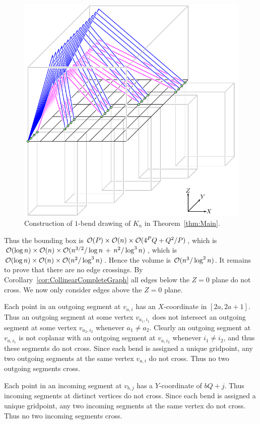 \documentclass[a4paper]{article}
\newcommand{\Oh}[1]{\ensuremath{\protect\mathcal{O}(#1)}}
\newcommand{\Figure}[4][htb]{
\begin{figure}[#1]
	\begin{center}#3\end{center}
	\vspace*{-2ex}
	\caption{\figlabel{#2}#4}
\end{figure}
}
\newcommand{\figlabel}[1]{\label{fig:#1}}
\newcommand{\thmref}[1]{Theorem~\ref{thm:#1}}
\newcommand{\corref}[1]{Corollary~\ref{cor:#1}}
\theoremstyle{plain}
\begin{document}
\Figure{VertexLayout}{\includegraphics{VertexLayout}}{Construction of $1$-bend
drawing of $K_n$ in \thmref{Main}.}

Thus the bounding box is $\Oh{P}\times\Oh{n}\times\Oh{4^PQ+Q^2/P}$, which is 
$\Oh{\log n}\times\Oh{n}\times\Oh{n^{3/2}/\log n\,+\,n^2/\log^3n}$, which is
$\Oh{\log n}\times\Oh{n}\times\Oh{n^2/\log^3n}$. Hence the volume is
\Oh{n^3/\log^2n}. It remains to prove that there are no edge crossings. By 
\corref{CollinearCompleteGraph} all edges below the $Z=0$ plane do not cross.
We now only consider edges above the $Z=0$ plane. 

Each point in an outgoing segment at $v_{a,i}$ has an $X$-coordinate in
$[2a,2a+1]$. Thus an outgoing segment at some vertex $v_{a_1,i_1}$ does not
intersect an outgoing segment at some vertex $v_{a_2,i_2}$ whenever $a_1\ne
a_2$. Clearly an outgoing segment at $v_{a,i_1}$ is not coplanar with an
outgoing segment at $v_{a,i_2}$ whenever $i_1\ne i_2$, and thus these segments
do not cross. Since each bend is assigned a unique gridpoint, any two outgoing
segments at the same vertex $v_{a,i}$ do not cross. Thus no two outgoing
segments cross.

Each point in an incoming segment at $v_{b,j}$ has a $Y$-coordinate of $bQ+j$.
Thus incoming segments at distinct vertices do not cross.  Since each bend is
assigned a unique gridpoint, any two incoming segments at the same vertex do not
cross. Thus no two incoming segments cross.
\end{document}
